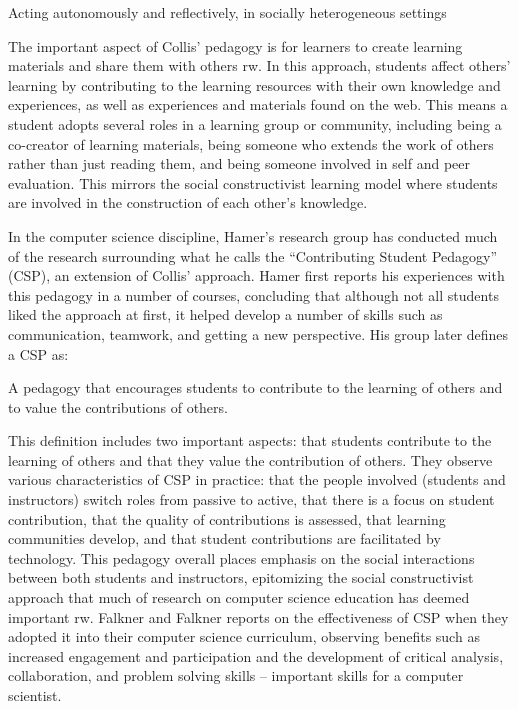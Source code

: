 \begin{itemize}
Acting autonomously and reflectively, in socially heterogeneous settings

The important aspect of Collis’ pedagogy is for learners to create learning materials and share them with others {rw}. In this approach, students affect others’ learning by contributing to the learning resources with their own knowledge and experiences, as well as experiences and materials found on the web. This means a student adopts several roles in a learning group or community, including being a co-creator of learning materials, being someone who extends the work of others rather than just reading them, and being someone involved in self and peer evaluation. This mirrors the social constructivist learning model where students are involved in the construction of each other’s knowledge.

In the computer science discipline, Hamer’s research group has conducted much of the research surrounding what he calls the “Contributing Student Pedagogy” (CSP), an extension of Collis’ approach. Hamer first reports his experiences \cite{hamer2006some} with this pedagogy in a number of courses, concluding that although not all students liked the approach at first, it helped develop a number of skills such as communication, teamwork, and getting a new perspective. His group later defines a CSP \cite{hamer2008contributing} as:

A pedagogy that encourages students to contribute to the learning of others and to value the contributions of others.

This definition includes two important aspects: that students contribute to the learning of others and that they value the contribution of others. They observe various characteristics of CSP in practice: that the people involved (students and instructors) switch roles from passive to active, that there is a focus on student contribution, that the quality of contributions is assessed, that learning communities develop, and that student contributions are facilitated by technology. This pedagogy overall places emphasis on the social interactions between both students and instructors, epitomizing the social constructivist approach that much of research on computer science education has deemed important {rw}. Falkner and Falkner \cite{falkner2012supporting} reports on the effectiveness of CSP when they adopted it into their computer science curriculum, observing benefits such as increased engagement and participation and the development of critical analysis, collaboration, and problem solving skills – important skills for a computer scientist.


\end{itemize}
